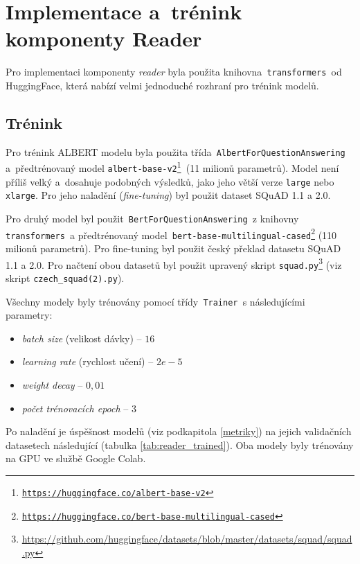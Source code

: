 \section{Implementace a~trénink komponenty Reader}
\label{reader_imp}
Pro implementaci komponenty \emph{reader} byla použita knihovna\texttt{ transformers }od HuggingFace, která nabízí velmi jednoduché rozhraní pro trénink modelů.\par

\subsection{Trénink}
Pro trénink ALBERT modelu byla použita třída\texttt{ AlbertForQuestionAnswering }a~předtrénovaný model \texttt{albert-base-v2\footnote{\url{https://huggingface.co/albert-base-v2}} }(11 milionů parametrů). Model není příliš velký a~dosahuje podobných výsledků, jako jeho větší verze \texttt{large} nebo \texttt{xlarge}. Pro jeho naladění (\emph{fine-tuning}) byl použit dataset SQuAD 1.1 a 2.0.\par
Pro druhý model byl použit\texttt{ BertForQuestionAnswering }z knihovny\texttt{ transformers }a předtrénovaný model\texttt{ bert-base-multilingual-cased\footnote{\url{https://huggingface.co/bert-base-multilingual-cased}}} (110 milionů parametrů). Pro fine-tuning byl použit český překlad datasetu SQuAD 1.1 a 2.0. Pro načtení obou datasetů byl použit upravený skript \texttt{squad.py}\footnote{\url{https://github.com/huggingface/datasets/blob/master/datasets/squad/squad.py}} (viz skript \texttt{czech\_squad(2).py}).\par
Všechny modely byly trénovány pomocí třídy\texttt{ Trainer }s následujícími parametry:
\begin{itemize}
    \item \emph{batch size} (velikost dávky) -- $16$
    \item \emph{learning rate} (rychlost učení) -- $2e\!-\!5$
    \item \emph{weight decay} -- $0,01$
    \item \emph{počet trénovacích epoch} -- $3$
\end{itemize}

Po naladění je úspěšnost modelů (viz podkapitola \ref{metriky}) na jejich validačních datasetech následující (tabulka \ref{tab:reader_trained}). Oba modely byly trénovány na GPU ve službě Google Colab.

